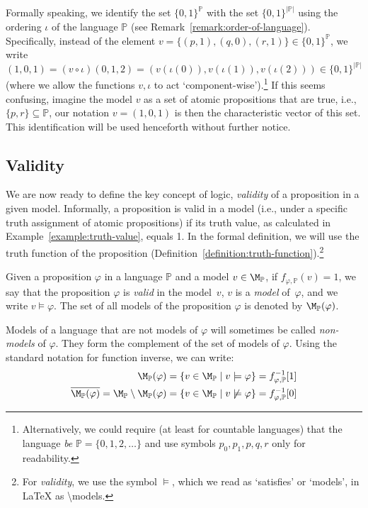 \begin{remark}
Formally speaking, we identify the set $\{0,1\}^\mathbb P$ with the set $\{0,1\}^{|\mathbb P|}$ using the ordering $\iota$ of the language $\mathbb P$ (see Remark~\ref{remark:order-of-language}). Specifically, instead of the element $v = \{(p,1),(q,0),(r,1)\} \in \{0,1\}^\mathbb P$, we write $(1,0,1) = (v \circ \iota)(0,1,2) = (v(\iota(0)),v(\iota(1)),v(\iota(2))) \in \{0,1\}^{|\mathbb P|}$ (where we allow the functions $v,\iota$ to act `component-wise').\footnote{Alternatively, we could require (at least for countable languages) that the language \emph{be} $\mathbb P = \{0,1,2,\dots\}$ and use symbols $p_0,p_1,p,q,r$ only for readability.} If this seems confusing, imagine the model $v$ as a set of atomic propositions that are true, i.e., $\{p,r\} \subseteq \mathbb P$, our notation $v = (1,0,1)$ is then the characteristic vector of this set. This identification will be used henceforth without further notice. 
\end{remark}


\subsection{Validity}

We are now ready to define the key concept of logic, \emph{validity} of a proposition in a given model. Informally, a proposition is valid in a model (i.e., under a specific truth assignment of atomic propositions) if its truth value, as calculated in Example~\ref{example:truth-value}, equals 1. In the formal definition, we will use the truth function of the proposition (Definition~\ref{definition:truth-function}).\footnote{For \emph{validity}, we use the symbol $\models$, which we read as `satisfies' or `models', in {\LaTeX} as {\textbackslash}models.}

\begin{definition}\label{definition:validity}
    Given a proposition $\varphi$ in a language $\mathbb P$ and a model $v \in \M_\mathbb P$, if $f_{\varphi,\mathbb P}(v) = 1$, we say that the proposition $\varphi$ is \emph{valid} in the model~$v$, $v$ is a \emph{model} of~$\varphi$, and we write $v \models \varphi$. The set of all models of the proposition $\varphi$ is denoted by $\M_\mathbb P(\varphi)$.
\end{definition}
Models of a language that are not models of $\varphi$ will sometimes be called \emph{non-models} of $\varphi$. They form the complement of the set of models of $\varphi$. Using the standard notation for function inverse, we can write:
\begin{align*}
    \M_\mathbb P(\varphi) &= \{v \in \M_\mathbb P \mid v \models \varphi\} = f_{\varphi,\mathbb P}^{-1}[1]\\
    \overline{\M_\mathbb P(\varphi)} = \M_\mathbb P \setminus \M_\mathbb P(\varphi) &= \{v \in \M_\mathbb P \mid v \not\models \varphi\} = f_{\varphi,\mathbb P}^{-1}[0]
\end{align*}

